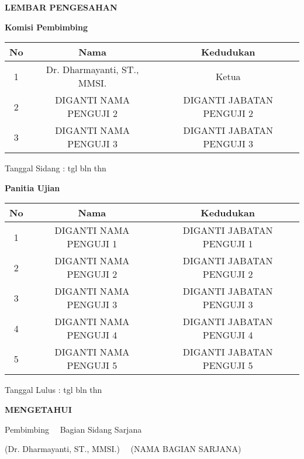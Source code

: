\newpage
{}
\begin{center}
{\large \bf \centering LEMBAR PENGESAHAN}

\vspace{0.75cm}

{\bf Komisi Pembimbing}

\vspace{0.5cm}

\begin{tabular}{|c|c|c|}
\hline
No & Nama & Kedudukan\\
\hline

 1& Dr. Dharmayanti, ST., MMSI.& Ketua \\
 \hline

 2& DIGANTI NAMA PENGUJI 2& DIGANTI JABATAN PENGUJI 2\\
 \hline
 3& DIGANTI NAMA PENGUJI 3& DIGANTI JABATAN PENGUJI 3\\
 \hline
\end{tabular}

\vspace{0.1cm}
\begin{flushright}
{Tanggal Sidang : tgl bln thn}
\end{flushright}

\vspace{0.5cm}

{\bf Panitia Ujian}

\vspace{0.5cm}

\begin{tabular}{|c|c|c|}
\hline
No & Nama & Kedudukan\\
\hline

 1& DIGANTI NAMA PENGUJI 1& DIGANTI JABATAN PENGUJI 1\\
 \hline

 2& DIGANTI NAMA PENGUJI 2& DIGANTI JABATAN PENGUJI 2\\
 \hline
 3& DIGANTI NAMA PENGUJI 3& DIGANTI JABATAN PENGUJI 3\\
 \hline
 4& DIGANTI NAMA PENGUJI 4& DIGANTI JABATAN PENGUJI 4\\
 \hline
 5& DIGANTI NAMA PENGUJI 5& DIGANTI JABATAN PENGUJI 5\\
 \hline
\end{tabular}

\vspace{0.1cm}
\begin{flushright}
{Tanggal Lulus : tgl bln thn}
\end{flushright}

{\bf MENGETAHUI}

\vspace{0.5cm}

{Pembimbing~ \hspace{5.0cm} ~Bagian Sidang Sarjana}%

\vspace{1.5cm}

{(Dr. Dharmayanti, ST., MMSI.)~ \hfill ~(NAMA BAGIAN SARJANA)}%


\end{center}
